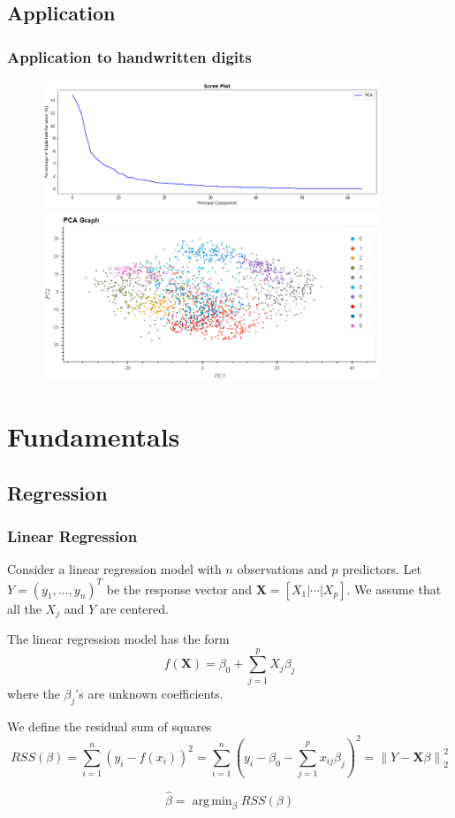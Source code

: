 \documentclass{beamer}
\theoremstyle{plain}
\theoremstyle{definition}
\newcommand{\mat}[1]{\mathbf{#1}}
\DeclareMathOperator*{\argmin}{arg\,min}
\newcommand{\norm}[1]{\left\lVert #1 \right\rVert}
\begin{document}
\subsection{Application}
\begin{frame}
\frametitle{Application to handwritten digits}
\begin{figure}
\centering
\includegraphics[width = 0.9\textwidth]{figures/pca_handwritten_digits_scree.png}
\includegraphics[width = 0.9\textwidth]{figures/pca_handwritten_digits.png}
\end{figure}
\end{frame}


\section{Fundamentals}

\subsection{Regression}
\begin{frame}
\frametitle{Linear Regression}
Consider a linear regression model with $n$ observations and $p$ predictors. Let $Y = (y_1, \ldots , y_n)^T$ be the response vector and $\mat X = \left[X_1 \vert \cdots \vert X_p \right]$. We assume that all the $X_j$ and $Y$ are centered.

The linear regression model has the form
$$f(\mat X) = \beta_0 + \sum_{j=1}^p X_j\beta_j$$
where the $\beta_j$'s are unknown coefficients.

We define the residual sum of squares
$$RSS(\beta) = \sum_{i=1}^n (y_i - f(x_i))^2 = \sum_{i=1}^n (y_i - \beta_0 - \sum_{j=1}^p x_{ij}\beta_j)^2 = \norm{Y - \mat{X}\beta}_{2}^{2}$$

$$\hat{\beta} = \argmin_{\beta} RSS(\beta)$$
\end{frame}
\end{document}
